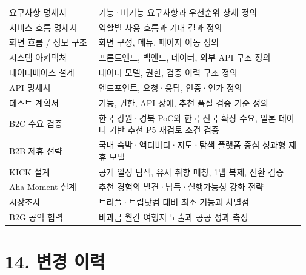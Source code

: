 \documentclass[12pt,a4paper]{article}
\newcommand{\DocNeedspace}[1]{\par\ifdim\dimexpr\pagegoal-\pagetotal\relax<#1\newpage\fi}
\renewcommand{\arraystretch}{1.35}
\newcommand{\TocNoChildTight}{\vspace{-0.28em}}
\begin{document}
\DocNeedspace{32\baselineskip}
\begin{small}
\setlength{\tabcolsep}{3pt}
\setlength{\extrarowheight}{1pt}
\renewcommand{\arraystretch}{1.42}
\begin{longtable}{@{}>{\centering\arraybackslash}m{0.298\linewidth}>{\RaggedRight\arraybackslash}m{0.674\linewidth}@{}}
\toprule
\multicolumn{1}{>{\centering\arraybackslash}m{0.298\linewidth}}{\textbf{문서}} & \multicolumn{1}{>{\centering\arraybackslash}m{0.674\linewidth}}{\textbf{목적}} \\
\midrule
\endhead
요구사항 명세서 & 기능·비기능 요구사항과 우선순위 상세 정의 \\
서비스 흐름 명세서 & 역할별 사용 흐름과 기대 결과 정의 \\
화면 흐름 / 정보 구조 & 화면 구성, 메뉴, 페이지 이동 정의 \\
시스템 아키텍처 & 프론트엔드, 백엔드, 데이터, 외부 API 구조 정의 \\
데이터베이스 설계 & 데이터 모델, 권한, 검증 이력 구조 정의 \\
API 명세서 & 엔드포인트, 요청·응답, 인증·인가 정의 \\
테스트 계획서 & 기능, 권한, API 장애, 추천 품질 검증 기준 정의 \\
B2C 수요 검증 & 한국 강원·경북 PoC와 한국 전국 확장 수요, 일본 데이터 기반 추천 P5 재검토 조건 검증 \\
B2B 제휴 전략 & 국내 숙박·액티비티·지도·탐색 플랫폼 중심 성과형 제휴 모델 \\
KICK 설계 & 공개 일정 탐색, 유사 취향 매칭, 1탭 복제, 전환 검증 \\
Aha Moment 설계 & 추천 경험의 발견·납득·실행가능성 강화 전략 \\
시장조사 & 트리플·트립닷컴 대비 최소 기능과 차별점 \\
B2G 공익 협력 & 비과금 월간 여행지 노출과 공공 성과 측정 \\
\bottomrule
\end{longtable}
\end{small}



\newpage

\DocNeedspace{10\baselineskip}
\section*{14. 변경 이력}
\addtocontents{toc}{\protect\TocNoChildTight}
\end{document}
